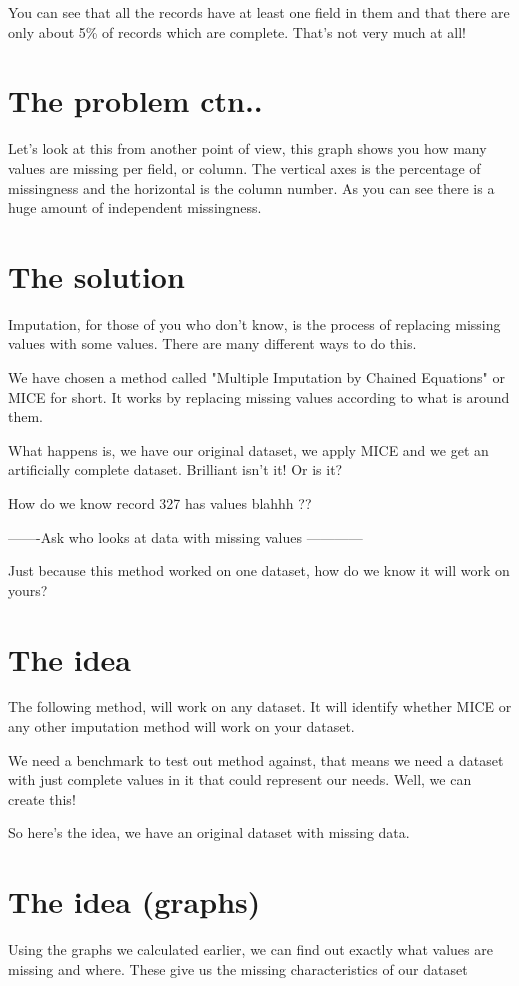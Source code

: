 \documentclass{report}
\begin{document}
You can see that all the records have at least one field in them and that there are only about 5\% of records which are complete. That's not very much at all!

\section*{The problem ctn..}
Let's look at this from another point of view, this graph shows you how many values are missing per field, or column. The vertical axes is the percentage of missingness and the horizontal is the column number. As you can see there is a huge amount of independent missingness. 

\section*{The solution}
Imputation, for those of you who don't know, is the process of replacing missing values with some values. There are many different ways to do this. 

We have chosen a method called "Multiple Imputation by Chained Equations" or MICE for short. It works by replacing missing values according to what is around them. 

What happens is, we have our original dataset, we apply MICE and we get an artificially complete dataset. Brilliant isn't it! Or is it? 

How do we know record 327 has values blahhh ?? 

-------Ask who looks at data with missing values ------------

Just because this method worked on one dataset, how do we know it will work on yours? 

\section*{The idea}
The following method, will work on any dataset. It will identify whether MICE or any other imputation method will work on your dataset. 

We need a benchmark to test out method against, that means we need a dataset with just complete values in it that could represent our needs. Well, we can create this!

So here's the idea, we have an original dataset with missing data. 

\section*{The idea (graphs)}
Using the graphs we calculated earlier, we can find out exactly what values are missing and where. These give us the missing characteristics of our dataset
\end{document}
